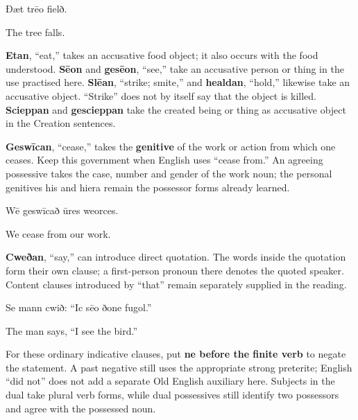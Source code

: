 Ðæt trēo fielð.

The tree falls.

\textbf{Etan}, “eat,” takes an accusative food object; it also occurs with the food understood. \textbf{Sēon} and \textbf{gesēon}, “see,” take an accusative person or thing in the use practised here. \textbf{Slēan}, “strike; smite,” and \textbf{healdan}, “hold,” likewise take an accusative object. “Strike” does not by itself say that the object is killed. \textbf{Scieppan} and \textbf{gescieppan} take the created being or thing as accusative object in the Creation sentences.

\textbf{Geswīcan}, “cease,” takes the \textbf{genitive} of the work or action from which one ceases. Keep this government when English uses “cease from.” An agreeing possessive takes the case, number and gender of the work noun; the personal genitives his and hiera remain the possessor forms already learned.

Wē geswīcað ūres weorces.

We cease from our work.

\textbf{Cweðan}, “say,” can introduce direct quotation. The words inside the quotation form their own clause; a first-person pronoun there denotes the quoted speaker. Content clauses introduced by “that” remain separately supplied in the reading.

Se mann cwið: “Ic sēo ðone fugol.”

The man says, “I see the bird.”

For these ordinary indicative clauses, put \textbf{ne before the finite verb} to negate the statement. A past negative still uses the appropriate strong preterite; English “did not” does not add a separate Old English auxiliary here. Subjects in the dual take plural verb forms, while dual possessives still identify two possessors and agree with the possessed noun.

